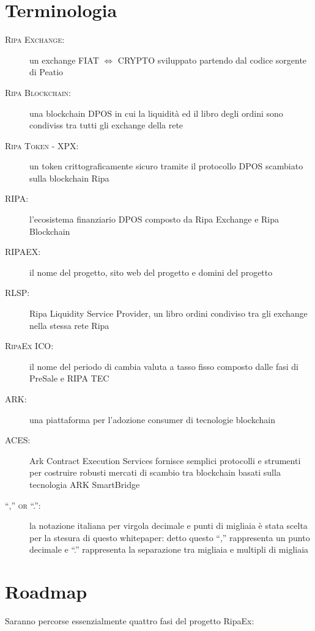 \documentclass[11pt,fleqn,oneside]{book} %
\begin{document}
\section{Terminologia}
\begin{description}
	\item[\textsc{Ripa Exchange:}] un exchange FIAT $\Leftrightarrow$ CRYPTO sviluppato partendo dal codice sorgente di Peatio \cite{peatio}
	\item[\textsc{Ripa Blockchain:}] una blockchain DPOS in cui la liquidità ed il libro degli ordini sono condiviss tra tutti gli exchange della rete
	\item[\textsc{Ripa Token - XPX:}] un token crittograficamente sicuro tramite il protocollo DPOS scambiato sulla blockchain Ripa 
	\item[\textsc{RIPA:}] l'ecosistema finanziario DPOS composto da Ripa Exchange e Ripa Blockchain
	\item[\textsc{RIPAEX:}] il nome del progetto, sito web del progetto e domini del progetto
	\item[\textsc{RLSP:}] Ripa Liquidity Service Provider, un libro ordini condiviso tra gli exchange nella stessa rete Ripa
	\item[\textsc{RipaEx ICO:}] il nome del periodo di cambia valuta a tasso fisso composto dalle fasi di PreSale e RIPA TEC	
	\item[\textsc{ARK:}] una piattaforma per l'adozione consumer di tecnologie blockchain \cite{ark}
	\item[\textsc{ACES:}] Ark Contract Execution Services \cite{aces} fornisce semplici protocolli e strumenti per costruire robusti
	mercati di scambio tra blockchain basati sulla tecnologia ARK SmartBridge
	\item[\textsc{“,” or “.”:}] la notazione italiana per virgola decimale e punti di migliaia è stata scelta per la stesura di questo 
	whitepaper: detto questo “,” rappresenta un punto decimale e “.” rappresenta la separazione tra migliaia e multipli di migliaia 
\end{description}

\pagebreak
\section{Roadmap}
Saranno percorse essenzialmente quattro fasi del progetto RipaEx:\\
\end{document}
